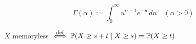 \begin{definition*} \vspace{-5pt}
  \[\Gamma(\alpha) := \int_0^\infty u^{\alpha-1}e^{-u} \, du \quad (\alpha > 0)\]
\end{definition*}

\begin{definition*}[Memorylessness]
  \(X\) memoryless \(\stackrel{\text{def}}{\iff} \P(X \geq s + t \mid X \geq s) = \P(X \geq t)\)
\end{definition*}
